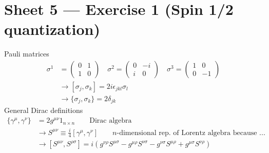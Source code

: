 \documentclass[10pt,a4paper]{report}
\theoremstyle{definition}
\begin{document}
\newpage

\section{Sheet 5 — Exercise 1 (Spin 1/2 quantization)}
Pauli matrices
\begin{align}
\sigma^1&=\left(\begin{array}{cc}0&1\\1&0\end{array}\right)
\quad
\sigma^2=\left(\begin{array}{cc}0&-i\\i&0\end{array}\right)
\quad
\sigma^3=\left(\begin{array}{cc}1&0\\0&-1\end{array}\right)\\
&\rightarrow[\sigma_j,\sigma_k]=2i\epsilon_{jkl}\sigma_l\\
&\rightarrow\{\sigma_j,\sigma_k\}=2\delta_{jk}
\end{align}
General Dirac definitions
\begin{align}
\{\gamma^\mu,\gamma^\nu\}&=2g^{\mu\nu} 1_{n\times n}\qquad\text{Dirac algebra}\\
&\rightarrow S^{\mu\nu}\equiv\frac{i}{4}[\gamma^\mu,\gamma^\nu]\qquad \text{$n$-dimensional rep. of Lorentz algebra because ...}\\
&\rightarrow [S^{\mu\nu},S^{\rho\sigma}]=i(
g^{\nu\rho}S^{\mu\sigma}
-g^{\mu\rho}S^{\nu\sigma}
-g^{\nu\sigma}S^{\mu\rho}
+g^{\mu\sigma}S^{\nu\rho})
\end{align}
\end{document}
